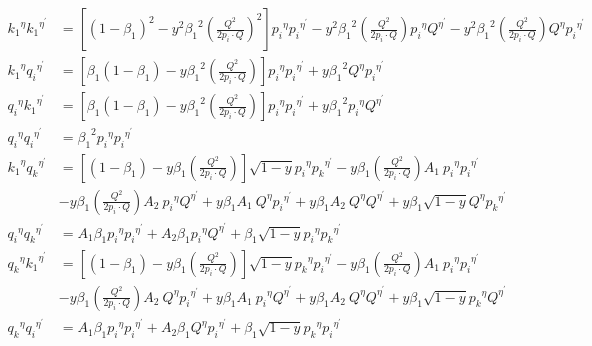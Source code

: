 \begin{equation}
\begin{split}
{k_1}^{{\eta}}{k_1}^{{\eta}^{\prime}}&=[(1-\beta_1)^2-y^2 {\beta_1}^2 (\frac{Q^2}{2p_i \cdot Q})^2] {p_i}^{{\eta}}{p_i}^{{\eta}^{\prime}}-y^2 {\beta_1}^2 (\frac{Q^2}{2p_i \cdot Q}){p_i}^{{\eta}}{Q}^{{\eta}^{\prime}}-y^2 {\beta_1}^2 (\frac{Q^2}{2p_i \cdot Q}){Q}^{{\eta}}{p_i}^{{\eta}^{\prime}}\\
{k_1}^{{\eta}}{q_i}^{{\eta}^{\prime}}&=[\beta_1(1-\beta_1)-y {\beta_1}^2 (\frac{Q^2}{2p_i \cdot Q})] {p_i}^{{\eta}}{p_i}^{{\eta}^{\prime}}+y {\beta_1}^2 {Q}^{{\eta}}{p_i}^{{\eta}^{\prime}}\\
{q_i}^{{\eta}}{k_1}^{{\eta}^{\prime}}&=[\beta_1(1-\beta_1)-y {\beta_1}^2 (\frac{Q^2}{2p_i \cdot Q})] {p_i}^{{\eta}}{p_i}^{{\eta}^{\prime}}+y {\beta_1}^2 {p_i}^{{\eta}}{Q}^{{\eta}^{\prime}}\\
{q_i}^{{\eta}}{q_i}^{{\eta}^{\prime}}&={\beta_1}^2 {p_i}^{{\eta}}{p_i}^{{\eta}^{\prime}}\\
{k_1}^{{\eta}}{q_k}^{{\eta}^{\prime}}&= [(1-\beta_1)-y\beta_1 (\frac{Q^2}{2p_i \cdot Q})] \sqrt{1-y}{p_i}^{{\eta}}{{p_k}^{{\eta}^{\prime}}}-y {\beta_1} (\frac{Q^2}{2p_i \cdot Q}) A_1 \:{p_i}^{{\eta}}{p_i}^{{\eta}^{\prime}}\\
&-y {\beta_1} (\frac{Q^2}{2p_i \cdot Q}) A_2\: {p_i}^{{\eta}}{Q}^{{\eta}^{\prime}}+y {\beta_1} A_1 \:{Q}^{{\eta}}{p_i}^{{\eta}^{\prime}}+y {\beta_1} A_2 \:{Q}^{{\eta}}{Q}^{{\eta}^{\prime}}+y {\beta_1}\sqrt{1-y}{Q}^{{\eta}}{{p_k}^{{\eta}^{\prime}}}\\
{q_i}^{{\eta}}{q_k}^{{\eta}^{\prime}}&=A_1\beta_1 {p_i}^{{\eta}}{{p_i}^{{\eta}^{\prime}}}+A_2\beta_1 {p_i}^{{\eta}}{{Q}^{{\eta}^{\prime}}}+\beta_1 \sqrt{1-y}{p_i}^{{\eta}}{{p_k}^{{\eta}^{\prime}}}\\
{q_k}^{\eta}{k_1}^{{{\eta}}^{\prime}}&=[(1-\beta_1)-y\beta_1 (\frac{Q^2}{2p_i \cdot Q})] \sqrt{1-y}{p_k}^{{\eta}}{{p_i}^{{\eta}^{\prime}}}-y {\beta_1} (\frac{Q^2}{2p_i \cdot Q}) A_1 \:{p_i}^{{\eta}}{p_i}^{{\eta}^{\prime}}\\
&-y {\beta_1} (\frac{Q^2}{2p_i \cdot Q}) A_2\: {Q}^{{\eta}}{p_i}^{{\eta}^{\prime}}+y {\beta_1} A_1 \:{p_i}^{{\eta}}{Q}^{{\eta}^{\prime}}+y {\beta_1} A_2 \:{Q}^{{\eta}}{Q}^{{\eta}^{\prime}}+y {\beta_1}\sqrt{1-y}{p_k}^{{\eta}}{{Q}^{{\eta}^{\prime}}}\\
{q_k}^{\eta}{q_i}^{{{\eta}}^{\prime}}&=A_1\beta_1 {p_i}^{{\eta}}{{p_i}^{{\eta}^{\prime}}}+A_2\beta_1 {Q}^{{\eta}}{{p_i}^{{\eta}^{\prime}}}+\beta_1 \sqrt{1-y}{p_k}^{{\eta}}{{p_i}^{{\eta}^{\prime}}}\\
\end{split}
\end{equation}

